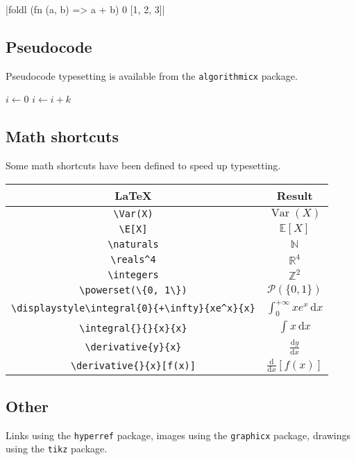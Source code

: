 \documentclass{article}
\theoremstyle{plain}
\theoremstyle{definition}
\theoremstyle{remark}
\DeclareMathOperator*{\Var}{Var}
\newcommand{\E}{\mathbb{E}}
\newcommand{\naturals}{\mathbb{N}}
\newcommand{\reals}{\mathbb{R}}
\newcommand{\integers}{\mathbb{Z}}
\newcommand{\powerset}{\mathcal{P}}
\newcommand{\integral}[4]{\int_{#1}^{#2} #3 \,\mathrm{d}#4}
\newcommand{\derivative}[2]{\frac{\mathrm{d}#1}{\mathrm{d}#2}}
\begin{document}
\smlshort|foldl (fn (a, b) => a + b) 0 [1, 2, 3]|

\subsection{Pseudocode}

Pseudocode typesetting is available from the \texttt{algorithmicx} package.

\begin{algorithmic}[1]
    \State $i\gets 0$
\Else
        \State $i\gets i+k$
    \EndIf
\EndIf
\end{algorithmic}

\subsection{Math shortcuts}

Some math shortcuts have been defined to speed up typesetting.

\begin{center}
\begin{tabular}{cc}
\hline
\textbf{\LaTeX} & \textbf{Result}\\
\hline
\verb|\Var(X)| & $\Var(X)$ \\
\verb|\E[X]| & $\E[X]$ \\
\verb|\naturals| & $\naturals$ \\
\verb|\reals^4| & $\reals^4$ \\
\verb|\integers| & $\integers^2$ \\
\verb|\powerset(\{0, 1\})| & $\powerset(\{0, 1\})$ \\
\verb|\displaystyle\integral{0}{+\infty}{xe^x}{x}| & $\displaystyle\integral{0}{+\infty}{xe^x}{x}$ \\
\verb|\integral{}{}{x}{x}| & $\integral{}{}{x}{x}$ \\
\verb|\derivative{y}{x}| & $\derivative{y}{x}$ \\
\verb|\derivative{}{x}[f(x)]| & $\derivative{}{x}[f(x)]$ \\
\hline
\end{tabular}
\end{center}

\subsection{Other}

Links using the \texttt{hyperref} package, images using the \texttt{graphicx} package, drawings using the \texttt{tikz} package.
\end{document}
